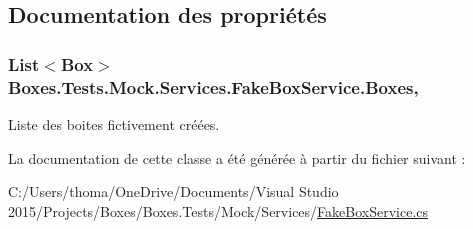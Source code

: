 \subsection{Documentation des propriétés}
\subsubsection[{\texorpdfstring{Boxes}{Boxes}}]{\setlength{\rightskip}{0pt plus 5cm}List$<$Box$>$ Boxes.\+Tests.\+Mock.\+Services.\+Fake\+Box\+Service.\+Boxes\hspace{0.3cm}{\ttfamily [get]}, {}}\hypertarget{class_boxes_1_1_tests_1_1_mock_1_1_services_1_1_fake_box_service_a3569dfb32a10167dcb57b87991f8e958}{}\label{class_boxes_1_1_tests_1_1_mock_1_1_services_1_1_fake_box_service_a3569dfb32a10167dcb57b87991f8e958}


Liste des boites fictivement créées. 



La documentation de cette classe a été générée à partir du fichier suivant \+:\begin{DoxyCompactItemize}
\item 
C\+:/\+Users/thoma/\+One\+Drive/\+Documents/\+Visual Studio 2015/\+Projects/\+Boxes/\+Boxes.\+Tests/\+Mock/\+Services/\hyperlink{_fake_box_service_8cs}{Fake\+Box\+Service.\+cs}\end{DoxyCompactItemize}
